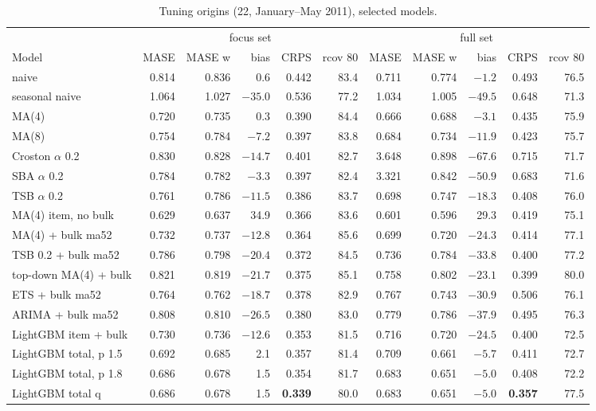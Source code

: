 \documentclass[11pt,a4paper]{article}
\begin{document}
\begin{table}[ht]
  \centering
  \footnotesize
  \setlength{\tabcolsep}{3pt}
  \caption{Tuning origins (22, January--May 2011), selected models.}
  \label{tab:tuning}
  \begin{tabular}{l rrrrr rrrrr}
    \toprule
    & \multicolumn{5}{c}{focus set} & \multicolumn{5}{c}{full set} \\
    \cmidrule(lr){2-6}\cmidrule(lr){7-11}
    Model & MASE & MASE w & bias & CRPS & rcov 80 & MASE & MASE w & bias & CRPS & rcov 80 \\
    \midrule
    naive & 0.814 & 0.836 & 0.6 & 0.442 & 83.4 & 0.711 & 0.774 & $-1.2$ & 0.493 & 76.5 \\
    seasonal naive & 1.064 & 1.027 & $-35.0$ & 0.536 & 77.2 & 1.034 & 1.005 & $-49.5$ & 0.648 & 71.3 \\
    MA(4) & 0.720 & 0.735 & 0.3 & 0.390 & 84.4 & 0.666 & 0.688 & $-3.1$ & 0.435 & 75.9 \\
    MA(8) & 0.754 & 0.784 & $-7.2$ & 0.397 & 83.8 & 0.684 & 0.734 & $-11.9$ & 0.423 & 75.7 \\
    Croston $\alpha$ 0.2 & 0.830 & 0.828 & $-14.7$ & 0.401 & 82.7 & 3.648 & 0.898 & $-67.6$ & 0.715 & 71.7 \\
    SBA $\alpha$ 0.2 & 0.784 & 0.782 & $-3.3$ & 0.397 & 82.4 & 3.321 & 0.842 & $-50.9$ & 0.683 & 71.6 \\
    TSB $\alpha$ 0.2 & 0.761 & 0.786 & $-11.5$ & 0.386 & 83.7 & 0.698 & 0.747 & $-18.3$ & 0.408 & 76.0 \\
    MA(4) item, no bulk & 0.629 & 0.637 & 34.9 & 0.366 & 83.6 & 0.601 & 0.596 & 29.3 & 0.419 & 75.1 \\
    MA(4) + bulk ma52 & 0.732 & 0.737 & $-12.8$ & 0.364 & 85.6 & 0.699 & 0.720 & $-24.3$ & 0.414 & 77.1 \\
    TSB 0.2 + bulk ma52 & 0.786 & 0.798 & $-20.4$ & 0.372 & 84.5 & 0.736 & 0.784 & $-33.8$ & 0.400 & 77.2 \\
    top-down MA(4) + bulk & 0.821 & 0.819 & $-21.7$ & 0.375 & 85.1 & 0.758 & 0.802 & $-23.1$ & 0.399 & 80.0 \\
    ETS + bulk ma52 & 0.764 & 0.762 & $-18.7$ & 0.378 & 82.9 & 0.767 & 0.743 & $-30.9$ & 0.506 & 76.1 \\
    ARIMA + bulk ma52 & 0.808 & 0.810 & $-26.5$ & 0.380 & 83.0 & 0.779 & 0.786 & $-37.9$ & 0.495 & 76.3 \\
    LightGBM item + bulk & 0.730 & 0.736 & $-12.6$ & 0.353 & 81.5 & 0.716 & 0.720 & $-24.5$ & 0.400 & 72.5 \\
    LightGBM total, p 1.5 & 0.692 & 0.685 & 2.1 & 0.357 & 81.4 & 0.709 & 0.661 & $-5.7$ & 0.411 & 72.7 \\
    LightGBM total, p 1.8 & 0.686 & 0.678 & 1.5 & 0.354 & 81.7 & 0.683 & 0.651 & $-5.0$ & 0.408 & 72.2 \\
    LightGBM total q & 0.686 & 0.678 & 1.5 & \textbf{0.339} & 80.0 & 0.683 & 0.651 & $-5.0$ & \textbf{0.357} & 77.5 \\
    \bottomrule
  \end{tabular}
\end{table}
\end{document}
